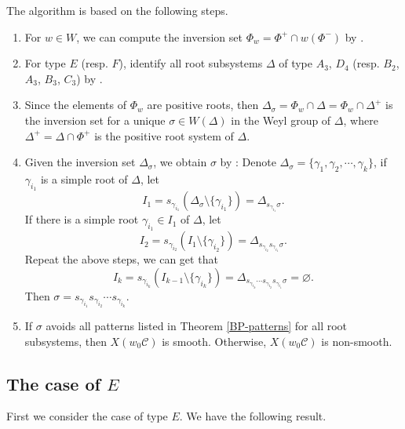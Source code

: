 \documentclass[11pt, reqno]{amsart}
\theoremstyle{definition}
\numberwithin{equation}{section}
\begin{document}
The algorithm is based on the following steps.
\begin{enumerate}
    \item For $w\in W$, we can compute the inversion set $\Phi_w=\Phi^+\cap w (\Phi^-)$ by \cite[§5.6-Exer.~1]{hum90}.

    \item For type $E$ (resp. $F$), identify all root subsystems $\Delta$ of type $A_3$, $D_4$ (resp. $B_2$, $A_3$, $B_3$, $C_3$) by \cite[Lem. 3.5]{BGWX}.

    \item Since the elements of $\Phi_w$ are positive roots, then $\Delta_\sigma=\Phi_w\cap \Delta=\Phi_w\cap\Delta^+$ is the inversion set for a unique $\sigma\in W(\Delta)$ in the Weyl group of $\Delta$, where $\Delta^+=\Delta\cap\Phi^+$ is the positive root system of $\Delta$.

    \item Given the inversion set $\Delta_\sigma$, we obtain $\sigma$ by  \cite[§5.6-Exer.~1]{hum90}:
    Denote $\Delta_\sigma=\{\gamma_1,\gamma_2,\cdots,\gamma_k\}$, if $\gamma_{i_1}$ is a simple root of $\Delta$, let $$I_1=s_{\gamma_{i_1}}(\Delta_\sigma\setminus\{\gamma_{i_1}\})=\Delta_{s_{\gamma_{i_1}}\sigma}.$$
If there is a simple root $\gamma_{i_1}\in I_1$ of $\Delta$, let $$I_2=s_{\gamma_{i_2}}(I_1\setminus\{\gamma_{i_2}\})=\Delta_{s_{\gamma_{i_2}}s_{\gamma_{i_1}}\sigma}.$$
Repeat the above steps, we can get that $$I_k=s_{\gamma_{i_k}}(I_{k-1}\setminus\{\gamma_{i_k}\})=\Delta_{s_{\gamma_{i_k}}\cdots s_{\gamma_{i_2}}s_{\gamma_{i_1}}\sigma}=\varnothing.$$
Then $\sigma=s_{\gamma_{i_1}}s_{\gamma_{i_2}}\cdots s_{\gamma_{i_k}}$.

    \item If $\sigma$ avoids all patterns listed in Theorem \ref{BP-patterns} for all root subsystems, then $X(w_0\mathcal{C})$ is smooth. Otherwise, $X(w_0\mathcal{C})$ is non-smooth.
\end{enumerate}

\subsection{The case of $E$}
First we consider the case of type $E$. We have the following result.
\end{document}
